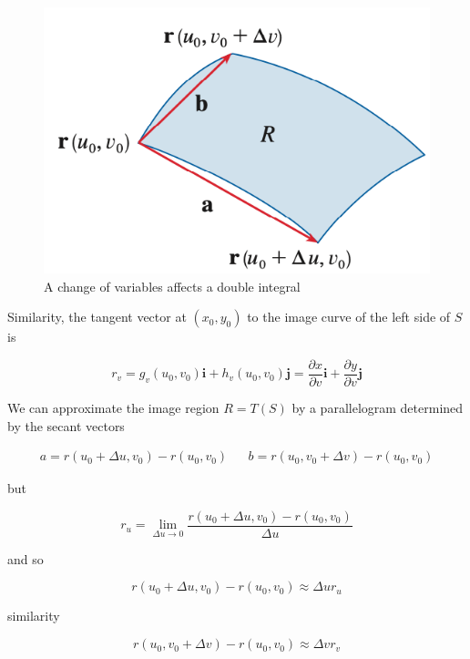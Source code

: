 \begin{figure}
    \centering
    \includegraphics[scale=0.3]{appendices/figures/fig010.png}
    \caption{A change of variables affects a double integral}
\end{figure}

Similarity, the tangent vector at $(x_0, y_0)$ to the image curve of the left side of $S$ is

\begin{equation}
    r_v = g_v(u_0, v_0)\mathbf{i} + h_v(u_0, v_0)\mathbf{j} = \frac{\partial x}{\partial v}\mathbf{i} + \frac{\partial y}{\partial v}\mathbf{j}
\end{equation}

We can approximate the image region $R=T(S)$ by a parallelogram determined by the secant vectors

\begin{align}
    a = r(u_0 + \Delta u, v_0) - r(u_0, v_0) && b = r(u_0, v_0 + \Delta v) - r(u_0, v_0)
\end{align}

but 

\begin{equation}
    r_u = \lim_{\Delta u \rightarrow 0} \frac{r(u_0 + \Delta u, v_0) - r(u_0, v_0)}{\Delta u}
\end{equation}

and so

\begin{equation}
    r(u_0 + \Delta u, v_0) - r(u_0, v_0) \approx \Delta u r_u
\end{equation}

similarity

\begin{equation}
    r(u_0, v_0 + \Delta v) - r(u_0, v_0) \approx \Delta v r_v
\end{equation}

